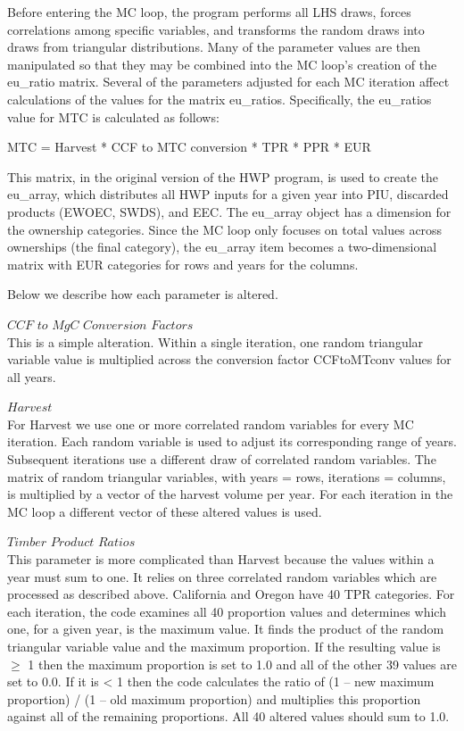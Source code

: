 \documentclass[
  openany]{book}
\begin{document}
Before entering the MC loop, the program performs all LHS draws, forces correlations among specific variables, and transforms the random draws into draws from triangular distributions. Many of the parameter values are then manipulated so that they may be combined into the MC loop's creation of the eu\_ratio matrix. Several of the parameters adjusted for each MC iteration affect calculations of the values for the matrix eu\_ratios. Specifically, the eu\_ratios value for MTC is calculated as follows:

MTC = Harvest * CCF to MTC conversion * TPR * PPR * EUR

This matrix, in the original version of the HWP program, is used to create the eu\_array, which distributes all HWP inputs for a given year into PIU, discarded products (EWOEC, SWDS), and EEC. The eu\_array object has a dimension for the ownership categories. Since the MC loop only focuses on total values across ownerships (the final category), the eu\_array item becomes a two-dimensional matrix with EUR categories for rows and years for the columns.

Below we describe how each parameter is altered.

\(\textit{CCF to MgC Conversion Factors}\)\\
This is a simple alteration. Within a single iteration, one random triangular variable value is multiplied across the conversion factor CCFtoMTconv values for all years.

\(\textit{Harvest}\)\\
For Harvest we use one or more correlated random variables for every MC iteration. Each random variable is used to adjust its corresponding range of years. Subsequent iterations use a different draw of correlated random variables. The matrix of random triangular variables, with years = rows, iterations = columns, is multiplied by a vector of the harvest volume per year. For each iteration in the MC loop a different vector of these altered values is used.

\(\textit{Timber Product Ratios}\)\\
This parameter is more complicated than Harvest because the values within a year must sum to one. It relies on three correlated random variables which are processed as described above. California and Oregon have 40 TPR categories. For each iteration, the code examines all 40 proportion values and determines which one, for a given year, is the maximum value. It finds the product of the random triangular variable value and the maximum proportion. If the resulting value is \(\geq\) 1 then the maximum proportion is set to 1.0 and all of the other 39 values are set to 0.0. If it is \textless{} 1 then the code calculates the ratio of (1 -- new maximum proportion) / (1 -- old maximum proportion) and multiplies this proportion against all of the remaining proportions. All 40 altered values should sum to 1.0.
\end{document}
